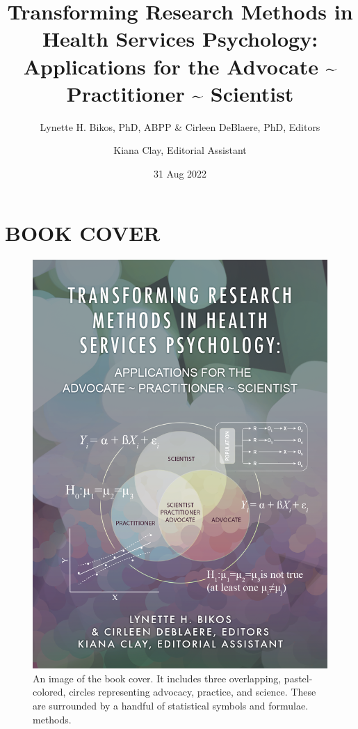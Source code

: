 \documentclass[
  11pt,
]{book}
\title{Transforming Research Methods in Health Services Psychology: Applications for the Advocate \textasciitilde{} Practitioner \textasciitilde{} Scientist}
\author{Lynette H. Bikos, PhD, ABPP \& Cirleen DeBlaere, PhD, Editors \and Kiana Clay, Editorial Assistant}
\date{31 Aug 2022}
\begin{document}
\maketitle

{
\hypersetup{linkcolor=}
\setcounter{tocdepth}{3}
\tableofcontents
}
\hypertarget{book-cover}{%
\chapter*{BOOK COVER}\label{book-cover}}

\begin{figure}
\centering
\includegraphics{images/bookcover.png}
\caption{An image of the book cover. It includes three overlapping, pastel-colored, circles representing advocacy, practice, and science. These are surrounded by a handful of statistical symbols and formulae. methods.}
\end{figure}
\end{document}
